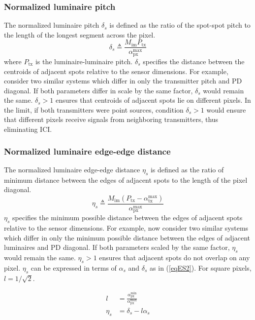 \subsubsection{Normalized luminaire pitch}
\label{subsubsec:frameworkPitch}
The normalized luminaire pitch $\delta_{s}$ is defined as the ratio of the spot-spot pitch to the length of the longest segment across the pixel. 
\begin{equation}
	\label{eqDeltaS}
	\delta_{s} \triangleq \frac{M_{\text{im}} P_{\text{tx}}}{\alpha_{\text{px}}^{\text{max}}}
\end{equation}
where $P_{\text{tx}}$ is the luminaire-luminaire pitch. $\delta_{s}$ specifies the distance between the centroids of adjacent spots relative to the sensor dimensions. For example, consider two similar systems which differ in only the transmitter pitch and PD diagonal. If both parameters differ in scale by the same factor, $\delta_{s}$ would remain the same. $\delta_{s}>1$ ensures that centroids of adjacent spots lie on different pixels. In the limit, if both transmitters were point sources, condition $\delta_{s}>1$ would ensure that different pixels receive signals from neighboring transmitters, thus eliminating ICI.

\subsubsection{Normalized luminaire edge-edge distance}
\label{subsubsec:frameworkEdge}
The normalized luminaire edge-edge distance $\eta_{s}$ is defined as the ratio of minimum distance between the edges of adjacent spots to the length of the pixel diagonal.
\begin{equation}
	\label{eqEtaS}
	\eta_{s} \triangleq \frac{M_{\text{im}}(P_{\text{tx}}-\alpha_{\text{tx}}^{\text{max}})}{\alpha_{\text{px}}^{\text{max}}}
\end{equation}
$\eta_{s}$ specifies the minimum possible distance between the edges of adjacent spots relative to the sensor dimensions. For example, now consider two similar systems which differ in only the minimum possible distance between the edges of adjacent luminaires and PD diagonal. If both parameters scaled by the same factor, $\eta_{s}$ would remain the same. $\eta_{s}>1$ ensures that adjacent spots do not overlap on any pixel. $\eta_{s}$ can be expressed in terms of $\alpha_{s}$ and $\delta_{s}$ as in (\ref{eqES2}). For square pixels, $l=1/\sqrt{2}$.

\begin{align}
	l &= \frac{\alpha_{\text{px}}^{\text{min}}}{\alpha_{\text{px}}^{\text{max}}}\label{eqESl}\\
	\eta_{s} &= \delta_{s} - l\alpha_{s}\label{eqES2}
\end{align}

